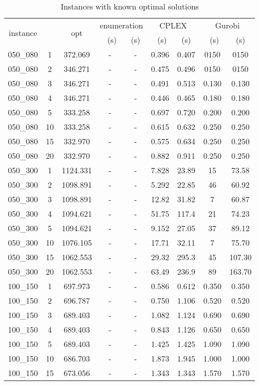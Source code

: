 \documentclass[10pt]{article}
\begin{document}
\begin{table}[h] \footnotesize
	\caption{Instances with known optimal solutions}
	\centering
\begin{tabular}{ccc|cc|cc|cc}
\hline 
\multirow{2}{*}{{instance}} & \multirow{2}{*}{{}} & \multirow{2}{*}{{opt}} & \multicolumn{2}{c|}{{enumeration}} & \multicolumn{2}{c|}{{CPLEX}} & \multicolumn{2}{c}{{Gurobi}}\tabularnewline
\cline{4-9} 
 &  &  & ~(s) & \multicolumn{1}{c}{ (s)} & ~(s) &  (s) & ~(s) &  (s)\tabularnewline
\hline 
{050\_080} & {1} & {372.069} & {-} & {-} & {0.396} & {0.407} & {0150} & {0150}\tabularnewline
{050\_080} & {2} & {346.271} & {-} & {-} & {0.475} & {0.496} & {0150} & {0150}\tabularnewline
{050\_080} & {3} & {346.271} & {-} & {-} & {0.491} & {0.513} & {0.130} & {0.130}\tabularnewline
{050\_080} & {4} & {346.271} & {-} & {-} & {0.446} & {0.465} & {0.180} & {0.180}\tabularnewline
{050\_080} & {5} & {333.258} & {-} & {-} & {0.697} & {0.720} & {0.200} & {0.200}\tabularnewline
{050\_080} & {10} & {333.258} & {-} & {-} & {0.615} & {0.632} & {0.250} & {0.250}\tabularnewline
{050\_080} & {15} & {332.970} & {-} & {-} & {0.575} & {0.634} & {0.250} & {0.250}\tabularnewline
{050\_080} & {20} & {332.970} & {-} & {-} & {0.882} & {0.911} & {0.250} & {0.250}\tabularnewline
\hline 
{050\_300} & {1} & {1124.331} & {-} & {-} & {7.828} & {23.89} & {15} & {73.58}\tabularnewline
{050\_300} & {2} & {1098.891} & {-} & - & {5.292} & {22.85} & {46} & {60.92}\tabularnewline
{050\_300} & {3} & {1098.891} & {-} & - & {12.82} & {31.82} & {7} & {60.87}\tabularnewline
{050\_300} & {4} & {1094.621} & {-} & - & {51.75} & {117.4} & {21} & {74.23}\tabularnewline
{050\_300} & {5} & {1094.621} & {-} & - & {9.152} & {27.05} & {37} & {89.12}\tabularnewline
{050\_300} & {10} & {1076.105} & {-} & - & {17.71} & {32.11} & {7} & {75.70}\tabularnewline
{050\_300} & {15} & {1062.553} & {-} & - & {29.32} & {295.3} & {45} & {107.30}\tabularnewline
{050\_300} & {20} & {1062.553} & {-} & - & {63.49} & {236.9} & {89} & {163.70}\tabularnewline
\hline 
{100\_150} & {1} & {697.973} & {-} & - & {0.586} & {0.612} & {0.350} & {0.350}\tabularnewline
{100\_150} & {2} & {696.787} & {-} & - & {0.750} & {1.106} & {0.520} & {0.520}\tabularnewline
{100\_150} & {3} & {689.403} & - & - & {1.082} & {1.124} & {0.690} & {0.690}\tabularnewline
{100\_150} & {4} & {689.403} & {-} & - & {0.843} & {1.126} & {0.650} & {0.650}\tabularnewline
{100\_150} & {5} & {689.403} & - & - & {1.425} & {1.425} & {1.090} & {1.090}\tabularnewline
{100\_150} & {10} & {686.703} & - & - & {1.873} & {1.945} & {1.000} & {1.000}\tabularnewline
{100\_150} & {15} & {673.056} & - & - & {1.343} & {1.343} & {1.570} & {1.570}\tabularnewline

\end{tabular}
\end{table}
\end{document}
